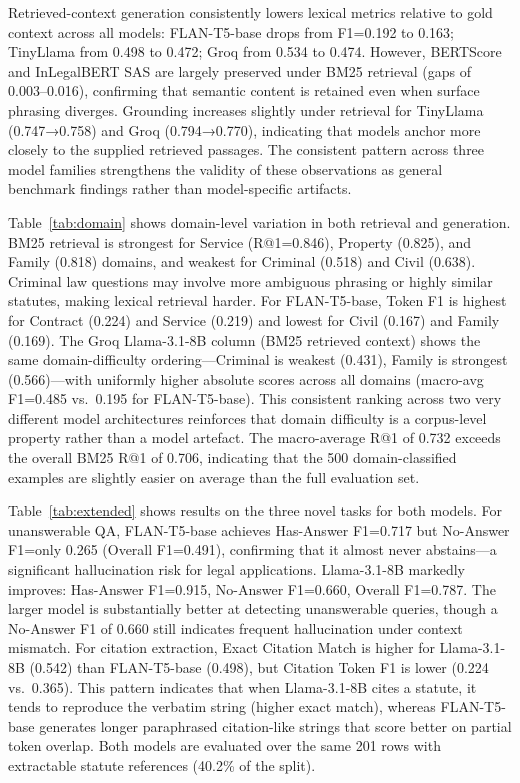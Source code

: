 \documentclass{article}
\begin{document}
Retrieved-context generation consistently lowers lexical metrics relative to gold context across all models: FLAN-T5-base drops from F1=0.192 to 0.163; TinyLlama from 0.498 to 0.472; Groq from 0.534 to 0.474. However, BERTScore and InLegalBERT SAS are largely preserved under BM25 retrieval (gaps of 0.003–0.016), confirming that semantic content is retained even when surface phrasing diverges. Grounding increases slightly under retrieval for TinyLlama (0.747→0.758) and Groq (0.794→0.770), indicating that models anchor more closely to the supplied retrieved passages. The consistent pattern across three model families strengthens the validity of these observations as general benchmark findings rather than model-specific artifacts.

Table~\ref{tab:domain} shows domain-level variation in both retrieval and generation. BM25 retrieval is strongest for Service (R@1=0.846), Property (0.825), and Family (0.818) domains, and weakest for Criminal (0.518) and Civil (0.638). Criminal law questions may involve more ambiguous phrasing or highly similar statutes, making lexical retrieval harder. For FLAN-T5-base, Token F1 is highest for Contract (0.224) and Service (0.219) and lowest for Civil (0.167) and Family (0.169). The Groq Llama-3.1-8B column (BM25 retrieved context) shows the same domain-difficulty ordering---Criminal is weakest (0.431), Family is strongest (0.566)---with uniformly higher absolute scores across all domains (macro-avg F1=0.485 vs.\ 0.195 for FLAN-T5-base). This consistent ranking across two very different model architectures reinforces that domain difficulty is a corpus-level property rather than a model artefact. The macro-average R@1 of 0.732 exceeds the overall BM25 R@1 of 0.706, indicating that the 500 domain-classified examples are slightly easier on average than the full evaluation set.

Table~\ref{tab:extended} shows results on the three novel tasks for both models. For unanswerable QA, FLAN-T5-base achieves Has-Answer F1=0.717 but No-Answer F1=only 0.265 (Overall F1=0.491), confirming that it almost never abstains---a significant hallucination risk for legal applications. Llama-3.1-8B markedly improves: Has-Answer F1=0.915, No-Answer F1=0.660, Overall F1=0.787. The larger model is substantially better at detecting unanswerable queries, though a No-Answer F1 of 0.660 still indicates frequent hallucination under context mismatch. For citation extraction, Exact Citation Match is higher for Llama-3.1-8B (0.542) than FLAN-T5-base (0.498), but Citation Token F1 is lower (0.224 vs.\ 0.365). This pattern indicates that when Llama-3.1-8B cites a statute, it tends to reproduce the verbatim string (higher exact match), whereas FLAN-T5-base generates longer paraphrased citation-like strings that score better on partial token overlap. Both models are evaluated over the same 201 rows with extractable statute references (40.2\% of the split).
\end{document}
